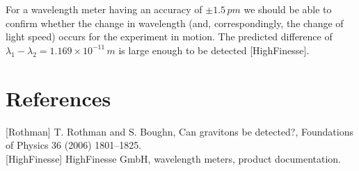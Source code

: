 \documentclass[11pt]{article}
\begin{document}
For a wavelength meter having an accuracy of $\pm 1.5 \,pm$
we should be able to confirm whether the change in wavelength (and, correspondingly, the change of light speed) occurs
for the experiment in motion. The predicted difference of $
\lambda_1 - \lambda_2 = 1.169\times 10^{-11} \, m$ is large enough to be
detected [HighFinesse].



\section*{References}
[Rothman] T. Rothman and S. Boughn, Can gravitons be detected?, Foundations of Physics 36 (2006) 1801--1825.\\
{[HighFinesse]} HighFinesse GmbH, wavelength meters, product documentation.
\end{document}
